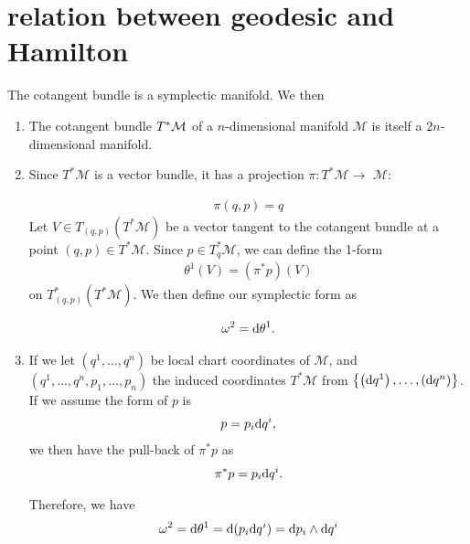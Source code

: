 \documentclass{article}
\begin{document}
\section{relation between geodesic and Hamilton}
The   cotangent bundle is a symplectic manifold. We then 
\begin{enumerate}
    \item {} The cotangent bundle $T^*\mathcal{M}$ of a $n$-dimensional manifold $\mathcal{M}$ is itself a $2 n$-dimensional manifold.
    \item {}
 Since $T^* \mathcal{M}$ is a vector bundle, it has a projection $\pi: T^* \mathcal{M} \to$ $\mathcal{M}$:
\bse
{}
\ese
\begin{align*}
    \pi(q,p) = q
\end{align*}
Let $V \in T_{(q, p)}\left(T^* \mathcal{M}\right)$ be a vector tangent to the cotangent bundle at a point $(q, p) \in T^* \mathcal{M}$. Since $p \in T_q^* \mathcal{M}$, we can define the 1-form
\begin{align*}
\theta^1(V)=\left(\pi^* p\right)(V)
\end{align*}
on $T^*_{(q, p)}\left(T^{*} \mathcal{M}\right)$. We then define our symplectic form as

\begin{align*}
\omega^2=\mathrm{d} \theta^1 .
\end{align*}
\item {}
If we let $\left(q^1, \ldots, q^n\right)$ be local chart coordinates of $\mathcal{M}$, and $\left(q^1, \ldots, q^n, p_1, \ldots, p_n\right)$ the induced coordinates $T^* \mathcal{M}$ from $\left\{\left(\mathrm{d} q^1\right),\ldots,\left(\mathrm{d} q^{n}\right)\right\}$. 
If we assume the form of $p$ is
\begin{align*}
    p= p_i \mathrm{d} q^i,
\end{align*}
we then have the pull-back of $\pi^* p$ as 
\begin{align*}
    \pi^* p = p_i \mathrm{d} q^i.
\end{align*}

Therefore, we have 
\begin{align*}
    \omega^2 = \mathrm{d} \theta^1 = \mathrm{d}(p_i \mathrm{d} q^i) =  \mathrm{d} p_i \wedge \mathrm{d} q^i
\end{align*}


\end{enumerate}
\end{document}
